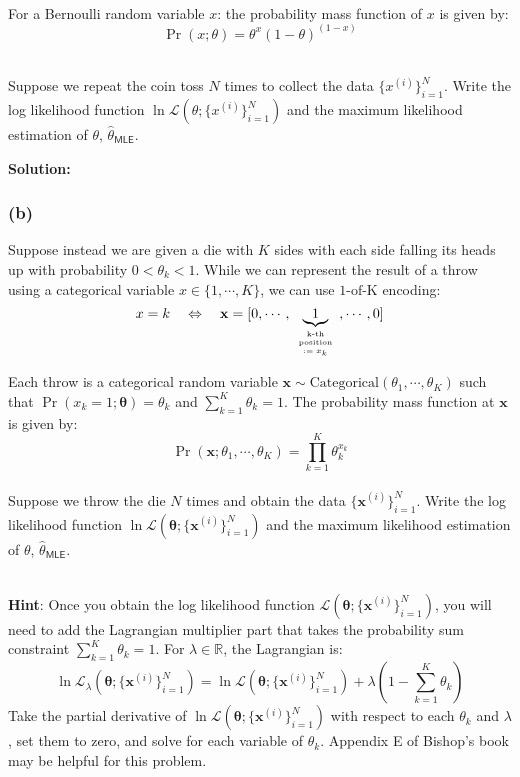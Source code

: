 \documentclass[11pt]{article}
\begin{document}
	\ \\
	For a Bernoulli random variable $x$: the probability mass function of
	$x$ is given by: $$\Pr( x; \theta) = \theta^x ( 1 - \theta)^{(1 - x)}$$
	
	\ \\
	Suppose we repeat the coin toss $N$ times
	to collect the data  $\{ x^{(i)}  \}_{i = 1}^N$. 
	Write the log likelihood function $\ln \mathcal{L}(\theta; \{ x^{(i)}\}_{i = 1}^N)$ and 
	the maximum likelihood estimation of $\theta$,  $\hat{\theta}_{\mathsf{MLE}}$.

{\noindent \bf Solution: }

\vfill 

\subsubsection*{(b)}
	
	Suppose instead we are given a die with $K$ sides with each side falling its heads up with
	probability $0 < \theta_k < 1$. While we can represent the result of a throw using
	a categorical variable $x \in \{1, \cdots, K\}$, we can use $\mbox{1-of-K}$ encoding:
	$$x = k \ \ \ \Leftrightarrow \ \ \ \mathbf{x} = [0, \cdots, 
	\underbrace{1}_{\tiny \begin{array}{c} 
		\mbox{k-th}\\
		\mbox{position}\\
		:= x_k
		\end{array}}, \cdots, 0]$$
	
	Each throw is a categorical random variable
	$\mathbf{x} \sim \mathrm{Categorical}(\theta_1, \cdots, \theta_K)$ such that
	$\Pr(x_k = 1; \mathbf{\theta}) = \theta_k$ and $\sum\limits_{k = 1}^K \theta_k = 1$.
	The probability mass function at $\mathbf{x}$ is given by: $$\Pr( \mathbf{x}; \theta_1, \cdots, \theta_K)
	 = \prod\limits_{k = 1}^K \theta_k ^{x_k}$$
	\ \\
	Suppose we throw the die $N$ times and obtain the data
	$\{ \mathbf{x}^{(i)} \}_{i = 1}^N$.	
	Write the log likelihood function $\ln \mathcal{L}(
	\mathbf{\theta}; \{ \mathbf{x}^{(i)}\}_{i = 1}^N )$ and 
	the maximum likelihood estimation of $\theta$,  $\hat{\theta}_{\mathsf{MLE}}$. 
	
	\ \\
	{\bf Hint}: Once you obtain the log likelihood function 
	$\mathcal{L}(
	\mathbf{\theta}; \{ \mathbf{x}^{(i)}\}_{i = 1}^N )$, you will need to add the Lagrangian multiplier part that takes 
	the probability sum constraint $\sum\limits_{k = 1}^K \theta_k = 1$. For $\lambda \in \mathbb{R}$,
	the Lagrangian is:
	$$\ln \mathcal{L}_{\lambda}(\mathbf{\theta}; \{ \mathbf{x}^{(i)}\}_{i = 1}^N) = 
	\ln \mathcal{L}(\mathbf{\theta}; \{ \mathbf{x}^{(i)}\}_{i = 1}^N) + 
	\lambda \left (1 - \sum\limits_{k = 1}^K \theta_k \right )$$
	Take the partial derivative of $\ln \mathcal{L}(
	\mathbf{\theta}; \{ \mathbf{x}^{(i)}\}_{i = 1}^N )$ with respect to each $\theta_k$ and $\lambda$, set them to zero,
	and solve for each variable of $\theta_k$. Appendix E of Bishop's book may be helpful for
	this problem.
	
\end{document}
